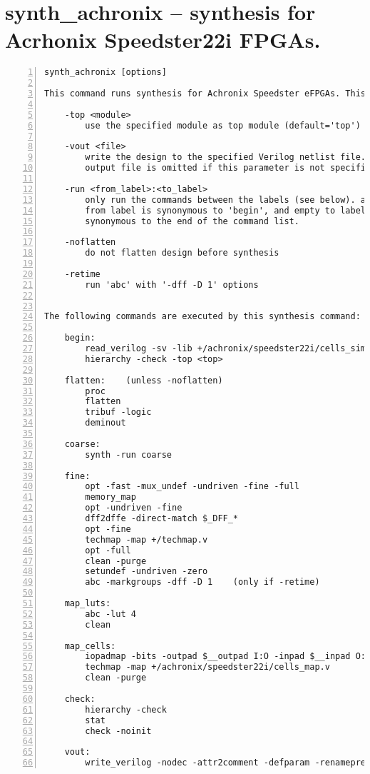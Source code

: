 \section{synth\_achronix -- synthesis for Acrhonix Speedster22i FPGAs.}
\label{cmd:synth_achronix}
\begin{lstlisting}[numbers=left,frame=single]
    synth_achronix [options]

This command runs synthesis for Achronix Speedster eFPGAs. This work is still experimental.

    -top <module>
        use the specified module as top module (default='top')

    -vout <file>
        write the design to the specified Verilog netlist file. writing of an
        output file is omitted if this parameter is not specified.

    -run <from_label>:<to_label>
        only run the commands between the labels (see below). an empty
        from label is synonymous to 'begin', and empty to label is
        synonymous to the end of the command list.

    -noflatten
        do not flatten design before synthesis

    -retime
        run 'abc' with '-dff -D 1' options


The following commands are executed by this synthesis command:

    begin:
        read_verilog -sv -lib +/achronix/speedster22i/cells_sim.v
        hierarchy -check -top <top>

    flatten:    (unless -noflatten)
        proc
        flatten
        tribuf -logic
        deminout

    coarse:
        synth -run coarse

    fine:
        opt -fast -mux_undef -undriven -fine -full
        memory_map
        opt -undriven -fine
        dff2dffe -direct-match $_DFF_*
        opt -fine
        techmap -map +/techmap.v
        opt -full
        clean -purge
        setundef -undriven -zero
        abc -markgroups -dff -D 1    (only if -retime)

    map_luts:
        abc -lut 4
        clean

    map_cells:
        iopadmap -bits -outpad $__outpad I:O -inpad $__inpad O:I
        techmap -map +/achronix/speedster22i/cells_map.v
        clean -purge

    check:
        hierarchy -check
        stat
        check -noinit

    vout:
        write_verilog -nodec -attr2comment -defparam -renameprefix syn_ <file-name>
\end{lstlisting}

